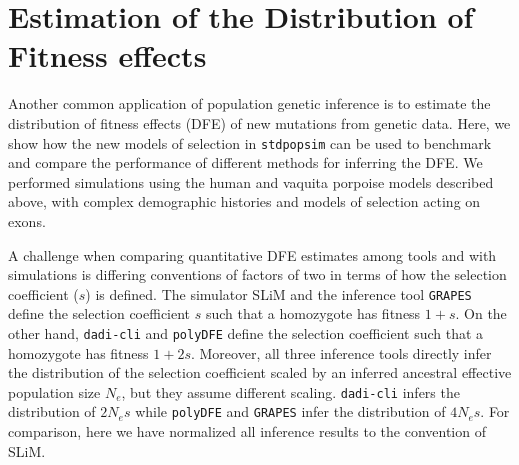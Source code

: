 \documentclass[hidelinks]{article}
\newcommand{\stdpopsim}{\texttt{stdpopsim}\xspace}
\newcommand{\polydfe}{\texttt{polyDFE}\xspace}
\newcommand{\dadicli}{\texttt{dadi-cli}\xspace}
\newcommand{\grapes}{\texttt{GRAPES}\xspace}
\begin{document}
\section*{Estimation of the Distribution of Fitness effects}
    \label{dfe}
    Another common application of population genetic inference is to estimate the distribution of fitness effects (DFE) of new mutations
    from genetic data. Here, we show how the new models of selection in \stdpopsim can be used to benchmark and compare
    the performance of different methods for inferring the DFE. We performed simulations using the 
    human and vaquita porpoise models described above, with complex demographic histories and models of selection acting on exons.
    
    A challenge when comparing quantitative DFE estimates among tools and with simulations is differing conventions of factors of two in terms of how the selection coefficient ($s$) is defined.
    The simulator SLiM and the inference tool \grapes define the selection coefficient $s$ such that a homozygote has fitness $1+s$.
    On the other hand, \dadicli and \polydfe define the selection coefficient such that a homozygote has fitness $1+ 2s$. %
    Moreover, all three inference tools directly infer the distribution of the selection coefficient scaled by an inferred ancestral effective population size $N_e$, but they assume different scaling.
    \dadicli infers the distribution of $2 N_e s$ while \polydfe and \grapes infer the distribution of $4 N_e s$. %
    For comparison, here we have normalized all inference results to the convention of SLiM.
           		
\end{document}
